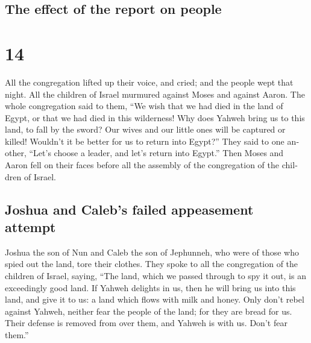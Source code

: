 \begin{paracol}{2}
\switchcolumn
\begin{otherlanguage}{english}

\hypertarget{the-effect-of-the-report-on-people}{%
\subsection{The effect of the report on
people}\label{the-effect-of-the-report-on-people}}

\hypertarget{section-27}{%
\section{14}\label{section-27}}

 All the congregation lifted up their voice, and cried;
and the people wept that night.  All the children of
Israel murmured against Moses and against Aaron. The whole congregation
said to them, ``We wish that we had died in the land of Egypt, or that
we had died in this wilderness!  Why does Yahweh bring us
to this land, to fall by the sword? Our wives and our little ones will
be captured or killed! Wouldn't it be better for us to return into
Egypt?''  They said to one another, ``Let's choose a
leader, and let's return into Egypt.''  Then Moses and
Aaron fell on their faces before all the assembly of the congregation of
the children of Israel.

\hypertarget{joshua-and-calebs-failed-appeasement-attempt}{%
\subsection{Joshua and Caleb's failed appeasement
attempt}\label{joshua-and-calebs-failed-appeasement-attempt}}

 Joshua the son of Nun and Caleb the son of Jephunneh, who
were of those who spied out the land, tore their clothes. 
They spoke to all the congregation of the children of Israel, saying,
``The land, which we passed through to spy it out, is an exceedingly
good land.  If Yahweh delights in us, then he will bring
us into this land, and give it to us: a land which flows with milk and
honey.  Only don't rebel against Yahweh, neither fear the
people of the land; for they are bread for us. Their defense is removed
from over them, and Yahweh is with us. Don't fear them.''

\hypertarget{gods-wrath-the-successful-intercession-of-moses-divine-judgment}{%
}
\end{otherlanguage}
\end{paracol}
